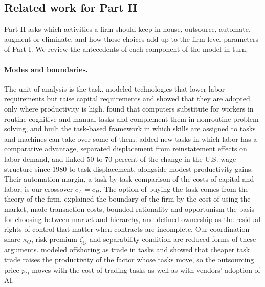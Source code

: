 \subsection{Related work for Part II}\label{sec:lit-part2}

Part II asks which activities a firm should keep in house, outsource, automate, augment or eliminate, and how those choices add up to the firm-level parameters of Part I. We review the antecedents of each component of the model in turn.

\paragraph{Modes and boundaries.} The unit of analysis is the task. \citet{zeira1998workers} modeled technologies that lower labor requirements but raise capital requirements and showed that they are adopted only where productivity is high. \citet{autor2003skill} found that computers substitute for workers in routine cognitive and manual tasks and complement them in nonroutine problem solving, and \citet{acemoglu2011skills} built the task-based framework in which skills are assigned to tasks and machines can take over some of them. \citet{acemoglu2018race} added new tasks in which labor has a comparative advantage, \citet{acemoglu2019automation} separated displacement from reinstatement effects on labor demand, and \citet{acemoglu2022tasks} linked 50 to 70 percent of the change in the U.S. wage structure since 1980 to task displacement, alongside modest productivity gains. Their automation margin, a task-by-task comparison of the costs of capital and labor, is our crossover $c_A=c_H$. The option of buying the task comes from the theory of the firm. \citet{coase1937nature} explained the boundary of the firm by the cost of using the market, \citet{williamson1985economic} made transaction costs, bounded rationality and opportunism the basis for choosing between market and hierarchy, and \citet{grossman1986costs} defined ownership as the residual rights of control that matter when contracts are incomplete. Our coordination share $\kappa_O$, risk premium $\zeta_O$ and separability condition are reduced forms of these arguments. \citet{grossman2008trading} modeled offshoring as trade in tasks and showed that cheaper task trade raises the productivity of the factor whose tasks move, so the outsourcing price $p_O$ moves with the cost of trading tasks as well as with vendors' adoption of AI.

